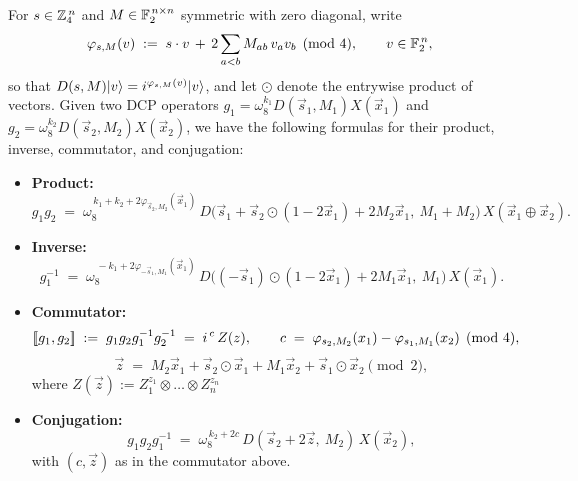 \begin{proposition}\label{prop:dcp-group-ops}
For $\vec{s}\in\Z_4^{\,n}$ and $M\in\F_2^{\,n\times n}$ symmetric with zero diagonal, write
\begin{align} \label{eq:phi-s-M}
    \varphi_{\vec{s},M}(\vec{v}) \;:=\; \vec{s}\cdot \vec{v} \,+\, 2 \sum_{a<b} M_{ab}\, v_a v_b \pmod 4, \qquad \vec{v} \in \F_2^{\,n},
\end{align}
so that $D(\vec{s},M)\ket{\vec{v}} = i^{\varphi_{\vec{s},M}(\vec{v})}\ket{\vec{v}}$, and let $\odot$ denote the entrywise product of vectors. Given two DCP operators $g_1 = \omega_8^{k_1} D(\vec{s}_1,M_1) X(\vec{x}_1)$ and $g_2 = \omega_8^{k_2} D(\vec{s}_2,M_2) X(\vec{x}_2)$, we have the following formulas for their product, inverse, commutator, and conjugation:
\begin{itemize}
    \item \textbf{Product:}
    \[
    g_1 g_2 \;=\; \omega_8^{\,k_1+k_2+2\varphi_{\vec{s}_2,M_2}(\vec{x}_1)}\, D\big(\vec{s}_1+\vec{s}_2\odot(1-2\vec{x}_1)+2M_2\vec{x}_1,\ M_1+M_2\big)\, X(\vec{x}_1\oplus \vec{x}_2).
    \]
    \item \textbf{Inverse:}
    \[
    g_1^{-1} \;=\; \omega_8^{\,-k_1+2\varphi_{-\vec{s}_1,M_1}(\vec{x}_1)}\, D\big((-\vec{s}_1)\odot(1-2\vec{x}_1)+2M_1\vec{x}_1,\ M_1\big)\, X(\vec{x}_1).
    \]
    \item \textbf{Commutator:}
    \[
    \gcomm{g_1}{g_2} \;:=\; g_1 g_2 g_1^{-1} g_2^{-1} \;=\; i^{\,c}\, Z(\vec{z}),
    \qquad
    c \;=\; \varphi_{\vec{s}_2,M_2}(\vec{x}_1) - \varphi_{\vec{s}_1,M_1}(\vec{x}_2) \pmod 4,
    \]
    \[
    \vec{z} \;=\; M_2\vec{x}_1 + \vec{s}_2\odot \vec{x}_1 + M_1\vec{x}_2 + \vec{s}_1\odot \vec{x}_2 \pmod 2,
    \]
    where $Z(\vec{z}) := Z_1^{z_1} \otimes \dots \otimes Z_n^{z_n}$
    \item \textbf{Conjugation:}
    \[
    g_1 g_2 g_1^{-1} \;=\; \omega_8^{\,k_2+2c}\, D(\vec{s}_2+2\vec{z},\ M_2)\, X(\vec{x}_2),
    \]
    with $(c,\vec{z})$ as in the commutator above.
\end{itemize}
\end{proposition}

